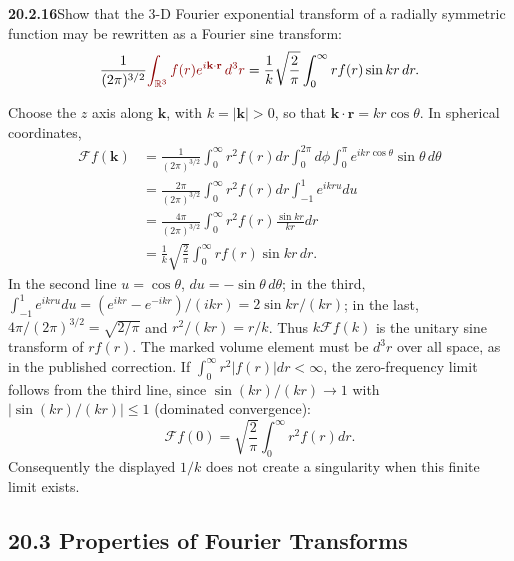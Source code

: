 \par\bigskip
\noindent\textbf{20.2.16}\quad Show that the 3-D Fourier
exponential transform of a radially symmetric function may be
rewritten as a Fourier sine transform:
\[
\frac{1}{(2\pi)^{3/2}}
\erratum{\int_{\mathbb R^3} f(r)e^{i\mathbf{k}\cdot\mathbf{r}}\,d^{3}r}
=\frac{1}{k}\sqrt{\frac{2}{\pi}}\int_{0}^{\infty}
r f(r)\sin kr\,dr.
\]
\par{}
\solution
Choose the $z$ axis along $\mathbf k$, with
$k=|\mathbf k|>0$, so that $\mathbf k\cdot\mathbf r=kr\cos\theta$.
In spherical coordinates,
\begin{align*}
\mathcal Ff(\mathbf k)
&=\frac1{(2\pi)^{3/2}}\int_0^\infty r^2f(r)dr
\int_0^{2\pi}d\phi\int_0^\pi e^{ikr\cos\theta}\sin\theta\,d\theta\\
&=\frac{2\pi}{(2\pi)^{3/2}}\int_0^\infty r^2f(r)dr
\int_{-1}^1 e^{ikru}du\\
&=\frac{4\pi}{(2\pi)^{3/2}}\int_0^\infty
r^2f(r)\frac{\sin kr}{kr}dr\\
&=\boxed{\frac1k\sqrt{\frac2\pi}\int_0^\infty rf(r)\sin kr\,dr}.
\end{align*}
In the second line $u=\cos\theta$, $du=-\sin\theta\,d\theta$; in
the third,
$\int_{-1}^1e^{ikru}du=(e^{ikr}-e^{-ikr})/(ikr)=2\sin kr/(kr)$;
in the last, $4\pi/(2\pi)^{3/2}=\sqrt{2/\pi}$ and $r^2/(kr)=r/k$.
Thus $k\mathcal Ff(k)$ is the unitary sine transform of $rf(r)$.
The marked volume element must be $d^3r$ over all space, as in
the published correction. If $\int_0^\infty r^2|f(r)|dr<\infty$,
the zero-frequency limit follows from the third line, since
$\sin(kr)/(kr)\to1$ with $|\sin(kr)/(kr)|\le1$ (dominated
convergence):
\[
\mathcal Ff(0)=\sqrt{\frac2\pi}\int_0^\infty r^2f(r)dr.
\]
Consequently the displayed $1/k$ does not create a singularity
when this finite limit exists.

\subsection*{20.3 Properties of Fourier Transforms}

